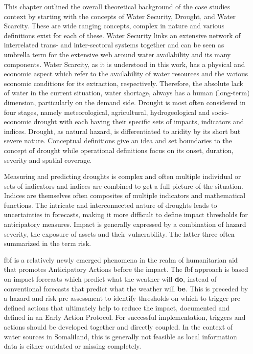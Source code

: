 This chapter outlined the overall theoretical background of the case studies context by starting with the concepts of Water Security, Drought, and Water Scarcity. These are wide ranging concepts, complex in nature and various definitions exist for each of these. Water Security links an extensive network of interrelated trans- and inter-sectoral systems together and can be seen as umbrella term for the extensive web around water availability and its many components. Water Scarcity, as it is understood in this work, has a physical and economic aspect which refer to the availability of water resources and the various economic conditions for its extraction, respectively. Therefore, the absolute lack of water in the current situation, water shortage, always has a human (long-term) dimension, particularly on the demand side. Drought is most often considered in four stages, namely meteorological, agricultural, hydrogeological and socio-economic drought with each having their specific sets of impacts, indicators and indices. Drought, as natural hazard, is differentiated to aridity by its short but severe nature. Conceptual definitions give an idea and set boundaries to the concept of drought while operational definitions focus on its onset, duration, severity and spatial coverage.

Measuring and predicting droughts is complex and often multiple individual or sets of indicators and indices are combined to get a full picture of the situation. Indices are themselves often composites of multiple indicators and mathematical functions. The intricate and interconnected nature of droughts leads to uncertainties in forecasts, making it more difficult to define impact thresholds for anticipatory measures. Impact is generally expressed by a combination of hazard severity, the exposure of assets and their vulnerability. The latter three often summarized in the term risk.\newline

\acrfull{fbf} is a relatively newly emerged phenomena in the realm of humanitarian aid that promotes Anticipatory Actions before the impact. The \acrshort{fbf} approach is based on impact forecasts which predict what the weather will \textbf{do}, instead of conventional forecasts that predict what the weather will \textbf{be}. This is preceded by a hazard and risk pre-assessment to identify thresholds on which to trigger pre-defined actions that ultimately help to reduce the impact, documented and defined in an Early Action Protocol. For successful implementation, triggers and actions should be developed together and directly coupled. In the context of water sources in Somaliland, this is generally not feasible as local information data is either outdated or missing completely.

